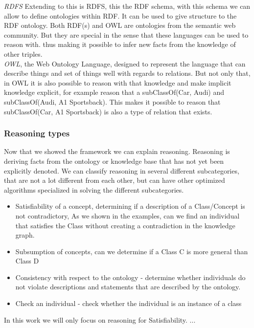 \documentclass{article}
\begin{document}
\textit{RDFS} \cite{} Extending to this is RDFS, this the RDF schema, with this schema we can allow to define ontologies within RDF. It can be used to give structure to the RDF ontology. Both RDF(s) and OWL are ontologies from the semantic web community. But they are special in the sense that these languages can be used to reason with. thus making it possible to infer new facts from the knowledge of other triples.\\

\textit{OWL}\cite{OWLPrimer:2012}, the Web Ontology Language, designed to represent the language that can describe things and set of things well with regards to relations. But not only that, in OWL it is also possible to reason with that knowledge and make implicit knowledge explicit, for example reason that a subClassOf(Car, Audi) and subClassOf(Audi, A1 Sportsback). This makes it possible to reason that subClassOf(Car, A1 Sportsback) is also a type of relation that exists. 

\subsubsection{Reasoning types}
Now that we showed the framework we can explain reasoning. Reasoning is deriving facts from the ontology or knowledge base that has not yet been explicitly denoted. We can classify reasoning in several different subcategories, that are not a lot different from each other, but can have other optimized algorithms specialized in solving the different subcategories.

\begin{itemize}
	\item Satisfiability of a concept, determining if a description of a Class/Concept is not contradictory, As we shown in the examples, can we find an individual that satisfies the Class without creating a contradiction in the knowledge graph. 
	\item Subsumption of concepts, can we determine if a Class C is more general than Class D
	\item Consistency with respect to the ontology - determine whether individuals do not violate descriptions and statements that are described by the ontology.
 	\item Check an individual - check whether the individual is an instance of a class
\end{itemize}

In this work we will only focus on reasoning for Satisfiability. ...
\end{document}
